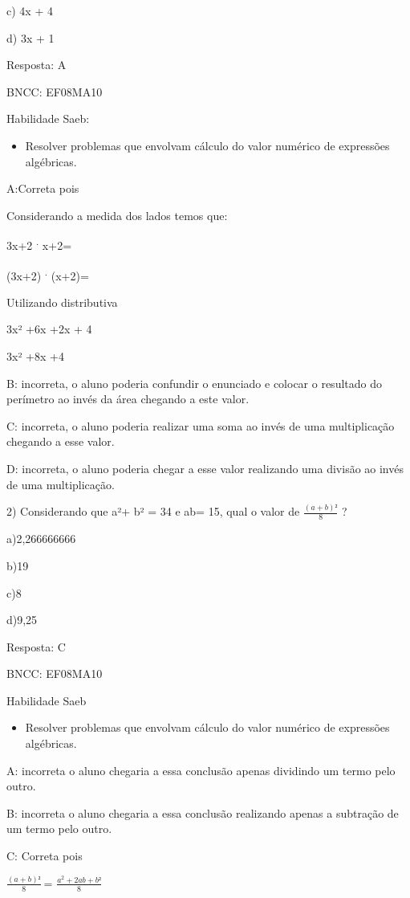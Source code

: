 {c) 4x + 4

d) 3x + 1

Resposta: A

BNCC: EF08MA10

Habilidade Saeb:

\begin{itemize}
\tightlist
\item
  Resolver problemas que envolvam cálculo do valor numérico de
  expressões algébricas.
\end{itemize}

A:Correta pois

Considerando a medida dos lados temos que:

3x+2 \textsuperscript{.} x+2=

(3x+2) \textsuperscript{.} (x+2)=

Utilizando distributiva

3x² +6x +2x + 4

3x² +8x +4

B: incorreta, o aluno poderia confundir o enunciado e colocar o
resultado do perímetro ao invés da área chegando a este valor.

C: incorreta, o aluno poderia realizar uma soma ao invés de uma
multiplicação chegando a esse valor.

D: incorreta, o aluno poderia chegar a esse valor realizando uma divisão
ao invés de uma multiplicação.

2) Considerando que a²+ b² = 34 e ab= 15, qual o valor de
\(\frac{(a + b)²}{8}\) ?

a)2,266666666

b)19

c)8

d)9,25

Resposta: C

BNCC: EF08MA10

Habilidade Saeb

\begin{itemize}
\tightlist
\item
  Resolver problemas que envolvam cálculo do valor numérico de
  expressões algébricas.
\end{itemize}

A: incorreta o aluno chegaria a essa conclusão apenas dividindo um termo
pelo outro.

B: incorreta o aluno chegaria a essa conclusão realizando apenas a
subtração de um termo pelo outro.

C: Correta pois

\(\frac{(a + b)²}{8}\ \)= \(\frac{a^{2} + 2ab + b²}{8}\)

}
